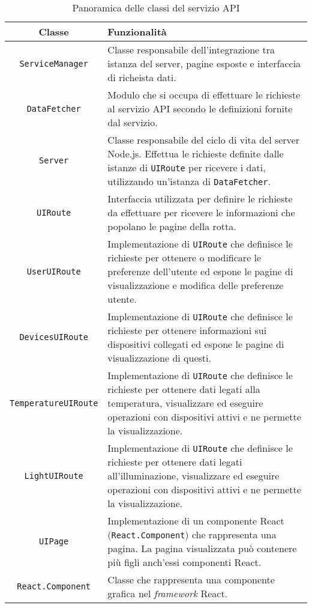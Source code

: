\begin{table}[H]
\caption{Panoramica delle classi del servizio API}
\label{tab:classi-web}
\begin{tabularx}{\linewidth}{|c|X|}
\hline
\textbf{Classe} & \textbf{Funzionalità} \\
\hline
\texttt{ServiceManager} & Classe responsabile dell'integrazione tra istanza del server, pagine esposte e interfaccia di richeista dati. \\
\hline
\texttt{DataFetcher} & Modulo che si occupa di effettuare le richieste al servizio API secondo le definizioni fornite dal servizio. \\
\hline
\texttt{Server} & Classe responsabile del ciclo di vita del server Node.js. Effettua le richieste definite dalle istanze di \texttt{UIRoute} per ricevere i dati, utilizzando un'istanza di \texttt{DataFetcher}. \\
\hline
\texttt{UIRoute} & Interfaccia utilizzata per definire le richieste da effettuare per ricevere le informazioni che popolano le pagine della rotta. \\
\hline
\texttt{UserUIRoute} & Implementazione di \texttt{UIRoute} che definisce le richieste per ottenere o modificare le preferenze dell'utente ed espone le pagine di visualizzazione e modifica delle preferenze utente. \\
\hline
\texttt{DevicesUIRoute} & Implementazione di \texttt{UIRoute} che definisce le richieste per ottenere informazioni sui dispositivi collegati ed espone le pagine di visualizzazione di questi. \\
\hline
\texttt{TemperatureUIRoute} & Implementazione di \texttt{UIRoute} che definisce le richieste per ottenere dati legati alla temperatura, visualizzare ed eseguire operazioni con dispositivi attivi e ne permette la visualizzazione. \\
\hline
\texttt{LightUIRoute} & Implementazione di \texttt{UIRoute} che definisce le richieste per ottenere dati legati all'illuminazione, visualizzare ed eseguire operazioni con dispositivi attivi e ne permette la visualizzazione. \\
\hline
\texttt{UIPage} & Implementazione di un componente React (\texttt{React.Component}) che rappresenta una pagina. La pagina visualizzata può contenere più figli anch'essi componenti React. \\
\hline
\texttt{React.Component} & Classe che rappresenta una componente grafica nel \emph{framework} React. \\
\hline
\end{tabularx}
\end{table}

